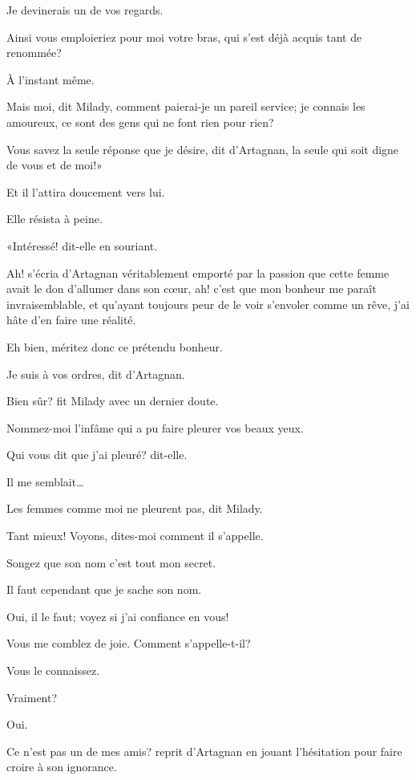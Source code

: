\speak  Je devinerais un de vos regards. 

\speak  Ainsi vous emploieriez pour moi votre bras, qui s'est déjà acquis tant de renommée? 

\speak  À l'instant même. 

Mais moi, dit Milady, comment paierai-je un pareil service; je connais les amoureux, ce sont des gens qui ne font rien pour rien? 

\speak  Vous savez la seule réponse que je désire, dit d'Artagnan, la seule qui soit digne de vous et de moi!» 

Et il l'attira doucement vers lui. 

Elle résista à peine. 

«Intéressé! dit-elle en souriant. 

\speak  Ah! s'écria d'Artagnan véritablement emporté par la passion que cette femme avait le don d'allumer dans son cœur, ah! c'est que mon bonheur me paraît invraisemblable, et qu'ayant toujours peur de le voir s'envoler comme un rêve, j'ai hâte d'en faire une réalité. 

\speak  Eh bien, méritez donc ce prétendu bonheur. 

\speak  Je suis à vos ordres, dit d'Artagnan. 

\speak  Bien sûr? fit Milady avec un dernier doute. 

\speak  Nommez-moi l'infâme qui a pu faire pleurer vos beaux yeux. 

\speak  Qui vous dit que j'ai pleuré? dit-elle. 

\speak  Il me semblait\dots 

\speak  Les femmes comme moi ne pleurent pas, dit Milady. 

\speak  Tant mieux! Voyons, dites-moi comment il s'appelle. 

\speak  Songez que son nom c'est tout mon secret. 

\speak  Il faut cependant que je sache son nom. 

\speak  Oui, il le faut; voyez si j'ai confiance en vous! 

\speak  Vous me comblez de joie. Comment s'appelle-t-il? 

\speak  Vous le connaissez. 

\speak  Vraiment? 

\speak  Oui. 

\speak  Ce n'est pas un de mes amis? reprit d'Artagnan en jouant l'hésitation pour faire croire à son ignorance. 

